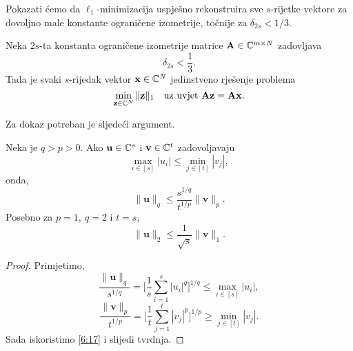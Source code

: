 \documentclass[a4paper,twoside,12pt]{memoir} %
\newcommand{\vect}[1]{\mathbf{#1}}
\renewcommand{\vec}{\vect}
\newcommand{\norm}[1]{\|{#1}\|}
\begin{document}
Pokazati \'cemo da $\ell_1$-minimizacija uspje\v{s}no rekonstruira sve $s$-rijetke vektore za dovoljno male konstante ograni\v{c}ene izometrije, to\v{c}nije za $\delta_{2s} < 1/3$.

\begin{thm}\label{tm:6:9} 
    Neka $2s$-ta konstanta ograni\v{c}ene izometrije matrice $\vec A \in \C^{m \times N}$ zadovljava 
    \begin{equation}\label{6:16}
        \delta_{2s} < \frac{1}{3} .
    \end{equation}
    Tada je svaki $s$-rijedak vektor $\vec x \in \C^N$ jedinstveno rje\v{s}enje problema 
    \begin{equation*}
        \min_{\vec z \in \C^N} \norm{\vec z}_1 \quad \text{uz uvjet } \vec{Az} = \vec{Ax}. 
    \end{equation*}
\end{thm}
Za dokaz potreban je sljede\'ci argument.
\begin{lem}\label{lem:6:10}
    Neka je $q > p > 0$. Ako $\vec u \in \C^s$ i $\vec v \in \C^t$ zadovoljavaju 
    \begin{equation}\label{6:17}
        \max_{i \in [s]} |u_i| \leq \min_{j \in [t]} |v_j|, 
    \end{equation}
    onda,
    \begin{equation*}
        \norm{\vec u}_q \leq \frac{s^{1/q}}{t^{1/p}} \norm{\vec v}_p.
    \end{equation*}
    Posebno za $p = 1,\  q = 2$ i $t = s$,
    \begin{equation*}
        \norm{\vec u}_2 \leq \frac{1}{\sqrt{s}} \norm{\vec v}_1.
    \end{equation*}
\end{lem}
\begin{proof}
    Primjetimo,
    \begin{equation*}
        \frac{\norm{\vec u}_q}{s^{1/q}} = \bigg[ \frac{1}{s} \sum_{i=1}^s |u_i|^q  \bigg]^{1/q} \leq \max_{i \in [s]} |u_i|, 
    \end{equation*}
    \begin{equation*}
        \frac{\norm{\vec v}_p}{t^{1/p}} = \bigg[ \frac{1}{t} \sum_{j=1}^t |v_j|^p  \bigg]^{1/p} \geq \min_{j \in [t]} |v_j|.
    \end{equation*}
    Sada iskoristimo \eqref{6:17} i slijedi tvrdnja.
\end{proof}
\end{document}
